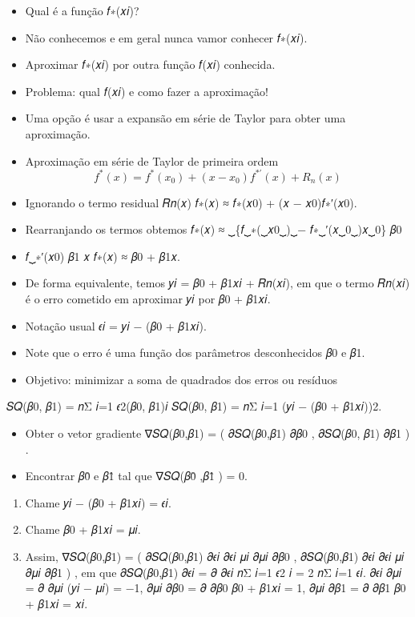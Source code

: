 \documentclass[
]{article}
\providecommand{\tightlist}{%
  \setlength{\itemsep}{0pt}\setlength{\parskip}{0pt}}
\begin{document}
\begin{itemize}
\item
  Qual é a função 𝑓∗(𝑥𝑖)?
\item
  Não conhecemos e em geral nunca vamor conhecer 𝑓∗(𝑥𝑖).
\item
  Aproximar 𝑓∗(𝑥𝑖) por outra função 𝑓(𝑥𝑖) conhecida.
\item
  Problema: qual 𝑓(𝑥𝑖) e como fazer a aproximação!
\item
  Uma opção é usar a expansão em série de Taylor para obter uma
  aproximação.
\item
  Aproximação em série de Taylor de primeira ordem
  \[ f^{*}(x) = f^{*}(x_0) + (x - x_0)f^{*'}(x) + R_n(x)\]
\item
  Ignorando o termo residual 𝑅𝑛(𝑥) 𝑓∗(𝑥) ≈ 𝑓∗(𝑥0) + (𝑥 − 𝑥0)𝑓∗′(𝑥0).
\item
  Rearranjando os termos obtemos 𝑓∗(𝑥) ≈ ⏟\{𝑓⏟∗(⏟𝑥0⏟)⏟− 𝑓∗⏟′(𝑥⏟0⏟)𝑥⏟0\}
  𝛽0
\item
  𝑓⏟∗′(𝑥0) 𝛽1 𝑥 𝑓∗(𝑥) ≈ 𝛽0 + 𝛽1𝑥.
\item
  De forma equivalente, temos 𝑦𝑖 = 𝛽0 + 𝛽1𝑥𝑖 + 𝑅𝑛(𝑥𝑖), em que o termo
  𝑅𝑛(𝑥𝑖) é o erro cometido em aproximar 𝑦𝑖 por 𝛽0 + 𝛽1𝑥𝑖.
\item
  Notação usual 𝜖𝑖 = 𝑦𝑖 − (𝛽0 + 𝛽1𝑥𝑖).
\item
  Note que o erro é uma função dos parâmetros desconhecidos 𝛽0 e 𝛽1.
\item
  Objetivo: minimizar a soma de quadrados dos erros ou resíduos \[ 
  \]
\end{itemize}

𝑆𝑄(𝛽0, 𝛽1) = 𝑛Σ 𝑖=1 𝜖2(𝛽0, 𝛽1)𝑖 𝑆𝑄(𝛽0, 𝛽1) = 𝑛Σ 𝑖=1 (𝑦𝑖 − (𝛽0 + 𝛽1𝑥𝑖))2.

\begin{itemize}
\tightlist
\item
  Obter o vetor gradiente ∇𝑆𝑄(𝛽0,𝛽1) = ( 𝜕𝑆𝑄(𝛽0,𝛽1) 𝜕𝛽0 , 𝜕𝑆𝑄(𝛽0, 𝛽1)
  𝜕𝛽1 ) .
\item
  Encontrar 𝛽0̂ e 𝛽1̂ tal que ∇𝑆𝑄(𝛽0̂ ,𝛽1̂ ) = 0.
\end{itemize}

\begin{enumerate}
\def\labelenumi{\arabic{enumi}.}
\tightlist
\item
  Chame 𝑦𝑖 − (𝛽0 + 𝛽1𝑥𝑖) = 𝜖𝑖.
\item
  Chame 𝛽0 + 𝛽1𝑥𝑖 = 𝜇𝑖.
\item
  Assim, ∇𝑆𝑄(𝛽0,𝛽1) = ( 𝜕𝑆𝑄(𝛽0,𝛽1) 𝜕𝜖𝑖 𝜕𝜖𝑖 𝜇𝑖 𝜕𝜇𝑖 𝜕𝛽0 , 𝜕𝑆𝑄(𝛽0,𝛽1) 𝜕𝜖𝑖
  𝜕𝜖𝑖 𝜇𝑖 𝜕𝜇𝑖 𝜕𝛽1 ) , em que 𝜕𝑆𝑄(𝛽0,𝛽1) 𝜕𝜖𝑖 = 𝜕 𝜕𝜖𝑖 𝑛Σ 𝑖=1 𝜖2 𝑖 = 2 𝑛Σ
  𝑖=1 𝜖𝑖. 𝜕𝜖𝑖 𝜕𝜇𝑖 = 𝜕 𝜕𝜇𝑖 (𝑦𝑖 − 𝜇𝑖) = −1, 𝜕𝜇𝑖 𝜕𝛽0 = 𝜕 𝜕𝛽0 𝛽0 + 𝛽1𝑥𝑖 = 1,
  𝜕𝜇𝑖 𝜕𝛽1 = 𝜕 𝜕𝛽1 𝛽0 + 𝛽1𝑥𝑖 = 𝑥𝑖.
\end{enumerate}
\end{document}
